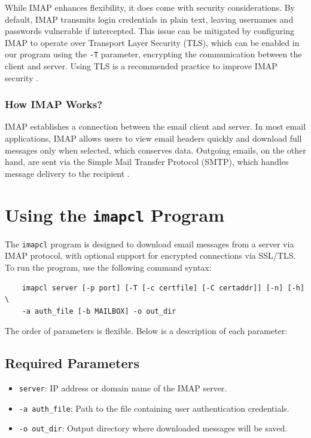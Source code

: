 \documentclass[a4paper,11pt]{article}
\begin{document}
While IMAP enhances flexibility, it does come with security considerations. By default, IMAP transmits 
login credentials in plain text, leaving usernames and passwords vulnerable if intercepted. This issue 
can be mitigated by configuring IMAP to operate over Transport Layer Security (TLS), which can be enabled 
in our program using the \texttt{-T} parameter, encrypting the communication between the client and server. 
Using TLS is a recommended practice to improve IMAP security \cite{what_is_imap, imap_pop_difference, email_protocols}.

\subsubsection{How IMAP Works?}
IMAP establishes a connection between the email client and server. In most email applications, IMAP allows users to view email headers quickly and download full messages only when selected, which conserves data. Outgoing emails, on the other hand, are sent via the Simple Mail Transfer Protocol (SMTP), which handles message delivery to the recipient \cite{techtarget-imap, email-protocols}.


\section{Using the \texttt{imapcl} Program}
The \texttt{imapcl} program is designed to download email messages from a server via IMAP protocol, 
with optional support for encrypted connections via SSL/TLS. To run the program, use the following 
command syntax:

\begin{verbatim}
    imapcl server [-p port] [-T [-c certfile] [-C certaddr]] [-n] [-h] \
    -a auth_file [-b MAILBOX] -o out_dir
    \end{verbatim}

The order of parameters is flexible. Below is a description of each parameter:

\subsection{Required Parameters}
\begin{itemize}
    \item \texttt{server}: IP address or domain name of the IMAP server.
    \item \texttt{-a auth\_file}: Path to the file containing user authentication credentials.
    \item \texttt{-o out\_dir}: Output directory where downloaded messages will be saved.
\end{itemize}
\end{document}
